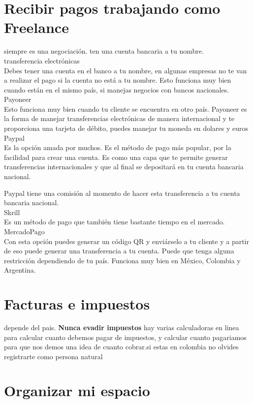 \documentclass{article}
\begin{document}
\section{Recibir pagos trabajando como Freelance}
siempre es una negociación. ten una cuenta bancaria a tu nombre. \\
transferencia electrónicas\\
Debes tener una cuenta en el banco a tu nombre, en algunas empresas no te van a realizar el pago si la cuenta no está a tu nombre. Esto funciona muy bien cuando están en el mismo país, si manejas negocios con bancos nacionales.
\\
Payoneer\\Esto funciona muy bien cuando tu cliente se encuentra en otro país. Payoneer es la forma de manejar transferencias electrónicas de manera internacional y te proporciona una tarjeta de débito, puedes manejar tu moneda en dolares y euros\\Paypal\\Es la opción amada por muchos. Es el método de pago más popular, por la facilidad para crear una cuenta. Es como una capa que te permite generar transferencias internacionales y que al final se depositará en tu cuenta bancaria nacional.

Paypal tiene una comisión al momento de hacer esta transferencia a tu cuenta bancaria nacional.\\Skrill\\Es un método de pago que también tiene bastante tiempo en el mercado.\\MercadoPago\\Con esta opción puedes generar un código QR y enviárselo a tu cliente y a partir de eso puede generar una transferencia a tu cuenta. Puede que tenga alguna restricción dependiendo de tu país. Funciona muy bien en México, Colombia y Argentina.

\section{Facturas e impuestos}
depende del pais. \textbf{Nunca evadir impuestos}
hay varias calculadoras en linea para calcular cuanto debemos pagar de impuestos, y calcular cuanto pagariamos para que nos demos una idea de cuanto cobrar.si estas en colombia no olvides registrarte como persona natural 

\section{Organizar mi espacio}
\end{document}
